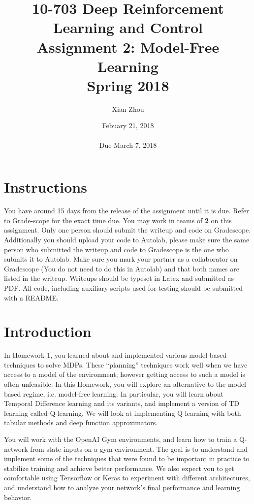 \documentclass[12pt]{article}
\title{10-703 Deep Reinforcement Learning and Control\\
  Assignment 2: Model-Free Learning\\
  Spring 2018\\
}
\author{Xian Zhou}
\date{Febuary 21, 2018\\
  \hspace{1cm}\\
Due March 7, 2018}
\begin{document}
\maketitle

\section*{Instructions}

You have around 15 days from the release of the assignment until it is due. Refer to Grade-scope for the exact time due.  You may work in teams of \textbf{2} on this assignment. Only one person should submit the writeup and code on Gradescope. Additionally you should upload your code to Autolab, please make sure the same person who submitted the writeup and code to Gradescope is the one who submits it to Autolab.  Make sure you mark your partner as a collaborator on Gradescope (You do not need to do this in Autolab) and that both names are listed in the writeup.  Writeups should be typeset in Latex and submitted as PDF. All code, including auxiliary scripts used for testing should be
submitted with a README.

\section*{Introduction}

In Homework 1, you learned about and implemented various model-based techniques to solve MDPs. These ``planning'' techniques work well when we have access to a model of the environment; however getting access to such a model is often unfeasible. In this Homework, you will explore an alternative to the model-based regime, i.e. model-free learning. 
In particular, you will learn about Temporal Difference learning and its variants, and implement a version of TD learning called Q-learning. We will look at implementing Q learning with both tabular methods and deep function approximators. 

You will work with the OpenAI Gym environments, and learn how to train a Q-network from state inputs on a gym environment. The goal is to understand and implement some of the techniques that were found to be important in practice to stabilize training and achieve better performance. We also expect you to get comfortable using Tensorflow or Keras to experiment with different architectures, and understand how to analyze your network's final performance and learning behavior. 
\end{document}
